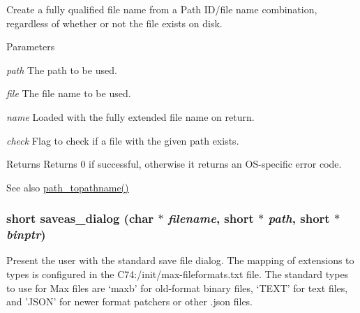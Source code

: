 Create a fully qualified file name from a Path ID/file name combination, regardless of whether or not the file exists on disk. 
\begin{DoxyParams}{Parameters}
\item[{\em path}]The path to be used. \item[{\em file}]The file name to be used. \item[{\em name}]Loaded with the fully extended file name on return. \item[{\em check}]Flag to check if a file with the given path exists. \end{DoxyParams}
\begin{DoxyReturn}{Returns}
Returns 0 if successful, otherwise it returns an OS-\/specific error code.
\end{DoxyReturn}
\begin{DoxySeeAlso}{See also}
\hyperlink{group__files_gacfce0e7df61bc36f82c61ff2bbf73ffb}{path\_\-topathname()} 
\end{DoxySeeAlso}
\hypertarget{group__files_gaf526009ce84aed6f6213c4a99f6bd72d}{
\subsubsection[{saveas\_\-dialog}]{\setlength{\rightskip}{0pt plus 5cm}short saveas\_\-dialog (char $\ast$ {\em filename}, \/  short $\ast$ {\em path}, \/  short $\ast$ {\em binptr})}}
\label{group__files_gaf526009ce84aed6f6213c4a99f6bd72d}


Present the user with the standard save file dialog. The mapping of extensions to types is configured in the C74:/init/max-\/fileformats.txt file. The standard types to use for Max files are ‘maxb’ for old-\/format binary files, ‘TEXT’ for text files, and 'JSON' for newer format patchers or other .json files.


